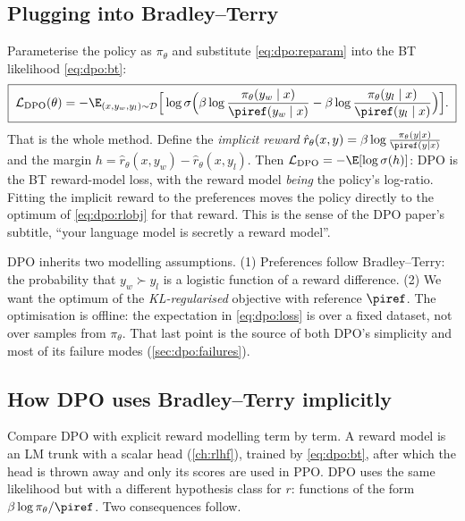 \subsection{Plugging into Bradley--Terry}

Parameterise the policy as $\pi_\theta$ and substitute \eqref{eq:dpo:reparam} into the BT
likelihood \eqref{eq:dpo:bt}:
\begin{equation}
\boxed{\;
\mathcal{L}_{\text{DPO}}(\theta) = -\E_{(x,y_w,y_l)\sim\mathcal{D}}\Big[\log\sigma\Big(
\beta\log\frac{\pi_\theta(y_w\mid x)}{\piref(y_w\mid x)}
-\beta\log\frac{\pi_\theta(y_l\mid x)}{\piref(y_l\mid x)}\Big)\Big].\;}
\label{eq:dpo:loss}
\end{equation}
That is the whole method. Define the \emph{implicit reward}
$\hat r_\theta(x,y)=\beta\log\frac{\pi_\theta(y\mid x)}{\piref(y\mid x)}$ and the margin
$h=\hat r_\theta(x,y_w)-\hat r_\theta(x,y_l)$. Then $\mathcal{L}_{\text{DPO}}=-\E[\log\sigma(h)]$:
DPO is the BT reward-model loss, with the reward model \emph{being} the policy's log-ratio. Fitting the
implicit reward to the preferences moves the policy directly to the optimum of
\eqref{eq:dpo:rlobj} for that reward. This is the sense of the DPO paper's subtitle, ``your
language model is secretly a reward model''.

\begin{keyidea}
DPO inherits two modelling assumptions. (1) Preferences follow Bradley--Terry: the probability that
$y_w\succ y_l$ is a logistic function of a reward difference. (2) We want the optimum of the
\emph{KL-regularised} objective with reference $\piref$. The optimisation is offline: the expectation in
\eqref{eq:dpo:loss} is over a fixed dataset, not over samples from $\pi_\theta$. That last point
is the source of both DPO's simplicity and most of its failure modes (\cref{sec:dpo:failures}).
\end{keyidea}

\subsection{How DPO uses Bradley--Terry implicitly}

Compare DPO with explicit reward modelling term by term. A reward model is an LM trunk with a
scalar head (\cref{ch:rlhf}), trained by \eqref{eq:dpo:bt}, after which the head is thrown away
and only its scores are used in PPO. DPO uses the same likelihood but with a different hypothesis
class for $r$: functions of the form $\beta\log\pi_\theta/\piref$. Two consequences follow.

